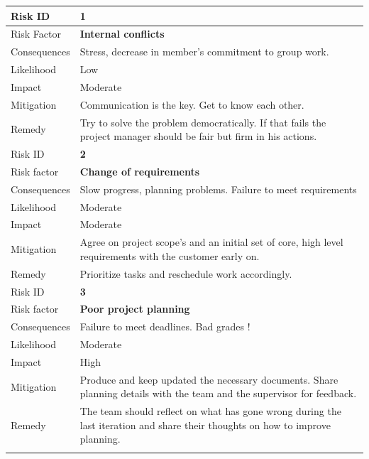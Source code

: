 \newpage

\begin{table}[h]
\begin{tabular}{ | l | p{11.5cm} | }

  \hline
  Risk ID & \textbf{1} \\
  \hline\noalign{\smallskip}\hline
  Risk Factor   & \textbf{Internal conflicts} \\
  Consequences  & Stress, decrease in member’s commitment to group work.\\
  Likelihood    & Low \\
  Impact        & Moderate \\
  Mitigation    & Communication is the key. Get to know each other. \\
  Remedy        & Try to solve the problem democratically. \newline
                If that fails the project manager should be fair but firm in his actions. \\
  \hline\noalign{\smallskip}\noalign{\smallskip}\hline
  
  
  Risk ID & \textbf{2} \\
  \hline\noalign{\smallskip}\hline
  Risk factor   & \textbf{Change of requirements} \\
  Consequences  & Slow progress, planning problems. Failure to meet requirements \\
  Likelihood    & Moderate \\
  Impact        & Moderate \\
  Mitigation    & Agree on project scope’s and an initial set of core, high level requirements with the customer early on. \\
  Remedy        & Prioritize tasks and reschedule work accordingly. \\
  \hline\noalign{\smallskip}\noalign{\smallskip}\hline

  Risk ID & \textbf{3} \\
  \hline\noalign{\smallskip}\hline
  Risk factor   & \textbf{Poor project planning} \\
  Consequences  & Failure to meet deadlines. Bad grades !\\
  Likelihood    & Moderate \\
  Impact        & High \\
  Mitigation    & Produce and keep updated the necessary documents.
                Share planning details with the team and the supervisor for feedback. \\
  Remedy        & The team should reflect on what has gone wrong during the last iteration and
                share their thoughts on how to improve planning. \\
  \hline\noalign{\smallskip}\noalign{\smallskip}\hline


\end{tabular}
\end{table}
